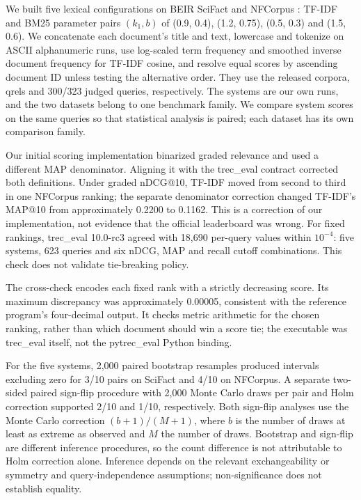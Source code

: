 \documentclass[runningheads]{llncs}
\begin{document}
We built five lexical configurations on BEIR SciFact and NFCorpus
\cite{r2}: TF-IDF and BM25 parameter pairs \((k_1, b)\) of (0.9, 0.4),
(1.2, 0.75), (0.5, 0.3) and (1.5, 0.6). We concatenate each document's
title and text, lowercase and tokenize on ASCII alphanumeric runs, use
log-scaled term frequency and smoothed inverse document frequency for
TF-IDF cosine, and resolve equal scores by ascending document ID unless
testing the alternative order. They use the released corpora, qrels and
300/323 judged queries, respectively. The systems are our own runs, and
the two datasets belong to one benchmark family. We compare system
scores on the same queries so that statistical analysis is paired; each
dataset has its own comparison family.

Our initial scoring implementation binarized graded relevance and used a
different MAP denominator. Aligning it with the trec\_eval contract
corrected both definitions. Under graded nDCG@10, TF-IDF moved from
second to third in one NFCorpus ranking; the separate denominator
correction changed TF-IDF's MAP@10 from approximately 0.2200 to 0.1162.
This is a correction of our implementation, not evidence that the
official leaderboard was wrong. For fixed rankings, trec\_eval 10.0-rc3
agreed with 18,690 per-query values within \(10^{-4}\): five systems,
623 queries and six nDCG, MAP and recall cutoff combinations. This check
does not validate tie-breaking policy.

The cross-check encodes each fixed rank with a strictly decreasing
score. Its maximum discrepancy was approximately 0.00005, consistent
with the reference program's four-decimal output. It checks metric
arithmetic for the chosen ranking, rather than which document should win
a score tie; the executable was trec\_eval itself, not the pytrec\_eval
Python binding.

For the five systems, 2,000 paired bootstrap resamples produced
intervals excluding zero for 3/10 pairs on SciFact and 4/10 on NFCorpus.
A separate two-sided paired sign-flip procedure with 2,000 Monte Carlo
draws per pair and Holm correction supported 2/10 and 1/10,
respectively. Both sign-flip analyses use the Monte Carlo correction
\((b+1)/(M+1)\), where \(b\) is the number of draws at least as extreme
as observed and \(M\) the number of draws. Bootstrap and sign-flip are
different inference procedures, so the count difference is not
attributable to Holm correction alone. Inference depends on the relevant
exchangeability or symmetry and query-independence assumptions;
non-significance does not establish equality.
\end{document}
